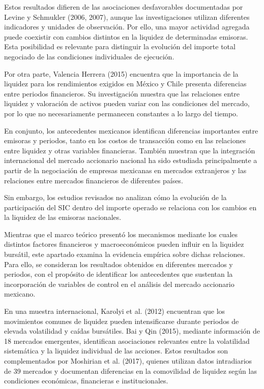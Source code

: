 Estos resultados difieren de las asociaciones desfavorables documentadas por Levine y Schmukler (2006, 2007), aunque las investigaciones utilizan diferentes indicadores y unidades de observación. Por ello, una mayor actividad agregada puede coexistir con cambios distintos en la liquidez de determinadas emisoras. Esta posibilidad es relevante para distinguir la evolución del importe total negociado de las condiciones individuales de ejecución.

Por otra parte, Valencia Herrera (2015) encuentra que la importancia de la liquidez para los rendimientos exigidos en México y Chile presenta diferencias entre periodos financieros. Su investigación muestra que las relaciones entre liquidez y valoración de activos pueden variar con las condiciones del mercado, por lo que no necesariamente permanecen constantes a lo largo del tiempo.

En conjunto, los antecedentes mexicanos identifican diferencias importantes entre emisoras y periodos, tanto en los costos de transacción como en las relaciones entre liquidez y otras variables financieras. También muestran que la integración internacional del mercado accionario nacional ha sido estudiada principalmente a partir de la negociación de empresas mexicanas en mercados extranjeros y las relaciones entre mercados financieros de diferentes países.

Sin embargo, los estudios revisados no analizan cómo la evolución de la participación del SIC dentro del importe operado se relaciona con los cambios en la liquidez de las emisoras nacionales.


Mientras que el marco teórico presentó los mecanismos mediante los cuales distintos factores financieros y macroeconómicos pueden influir en la liquidez bursátil, este apartado examina la evidencia empírica sobre dichas relaciones. Para ello, se consideran los resultados obtenidos en diferentes mercados y periodos, con el propósito de identificar los antecedentes que sustentan la incorporación de variables de control en el análisis del mercado accionario mexicano.

En una muestra internacional, Karolyi et al. (2012) encuentran que los movimientos comunes de liquidez pueden intensificarse durante periodos de elevada volatilidad y caídas bursátiles. Bai y Qin (2015), mediante información de 18 mercados emergentes, identifican asociaciones relevantes entre la volatilidad sistemática y la liquidez individual de las acciones. Estos resultados son complementados por Moshirian et al. (2017), quienes utilizan datos intradiarios de 39 mercados y documentan diferencias en la comovilidad de liquidez según las condiciones económicas, financieras e institucionales.

